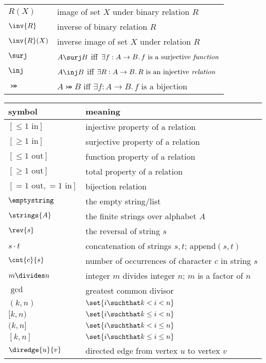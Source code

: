 \begin{center}
\begin{tabular}{ll}
$R(X)$         & image of set $X$ under binary relation $R$\\
$\inv{R}$      & inverse of binary relation $R$\\
$\inv{R}(X)$   & inverse image of set $X$ under relation $R$\\
$\surj$        & $A \surj B$ iff $\exists f:A \to B.\, f\text{ is a
  surjective \emph{function}}$\\
$\inj$         & $A \inj B$ iff $\exists R:A \to B.\, R\text{ is an
  injective \emph{relation}}$\\
$\bij$         & $A \bij B$ iff $\exists f:A \to B.\, f\text{ is a
  bijection}$
\end{tabular}
\end{center}

\begin{center}
\begin{tabular}{ll}
symbol         &  meaning\\
\hline
$[\leq 1\text{ in}]$  & injective property of a relation\\
$[\geq 1\text{ in}]$  & surjective property of a relation\\
$[\leq 1\text{ out}]$  & function property of a relation\\
$[\geq 1\text{ out}]$  & total property of a relation\\
$[= 1\text{ out}, = 1\text{ in}]$  & bijection relation\\
$\emptystring$ & the empty string/list\\
$\strings{A}$  & the finite strings over alphabet $A$\\
$\rev{s}$      & the reversal of string $s$\\
$s \cdot t$    & concatenation of strings $s,t$; $\text{append}(s,t)$\\
$\cnt{c}{s}$   & number of occurrences of character $c$ in string $s$\\
$m \divides n$ & integer $m$ divides integer $n$; $m$ is a factor of $n$\\
$\gcd{}{}$     & greatest common divisor\\
$(k, n)$       & $\set{i \suchthat k < i < n}$\\
$[k, n)$       & $\set{i \suchthat k \le i < n}$\\
$(k, n]$       & $\set{i \suchthat k < i \le n}$\\
$[k,n]$        & $\set{i \suchthat k \le i \le n}$\\
$\diredge{u}{v}$ & directed edge from vertex $u$ to vertex $v$\\

\end{tabular}
\end{center}
